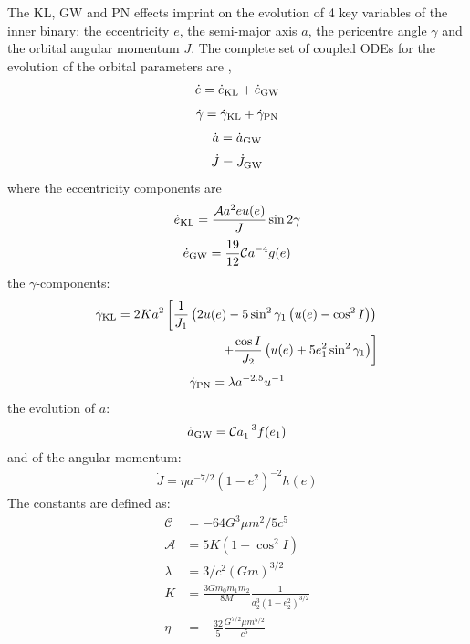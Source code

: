 \documentclass[a4paper,fleqn,usenatbib]{mnras}
\begin{document}
\noindent The KL, GW and PN effects imprint on the evolution of 4 key variables of the inner binary: the eccentricity $e$, the semi-major axis $a$, the pericentre angle $\gamma$ and the orbital angular momentum $J$. The complete set of coupled ODEs for the evolution of the orbital parameters are \citep{Randall2018},
\begin{eqnarray}
\dot{e} = \dot{e}_{\rm KL} + \dot{e}_{\rm GW}
\label{eq:edot}
\end{eqnarray}
\begin{eqnarray}
\dot{\gamma} = \dot{\gamma}_{\rm KL} + \dot{\gamma}_{\rm PN}
\end{eqnarray}
\begin{eqnarray}
\dot{a} = \dot{a}_{\rm GW} 
\label{eq:gwdot}
\end{eqnarray}
\begin{eqnarray}
\dot{J} = \dot{J}_{\rm GW} 
\label{eq:gwdot}
\end{eqnarray}
where the eccentricity components are
\begin{eqnarray}
\dot{e}_{\rm KL} =   \frac{\mathcal{A} a^2 e u(e)}{J}  \sin 2 \gamma
\end{eqnarray}
\begin{eqnarray}
\dot{e}_{\rm GW} = \frac{19}{12} \mathcal{C} a^{-4} g(e)
\end{eqnarray}
the $\gamma$-components:
\begin{align}
\dot{\gamma}_{\rm KL} = 2 Ka^2\left[\frac{1}{J_{1}}\left(2u(e)-5 \sin ^{2} \gamma_{1}\left(u(e)-\cos ^{2} I\right) \right)\right. \\
\left.+\frac{\cos I}{J_{2}}\left(u(e)+5 e_{1}^{2} \sin ^{2} \gamma_{1}\right) \right]
\end{align}
\begin{eqnarray}
\dot{\gamma}_{\rm PN} = \lambda a^{-2.5} u^{-1 }
\end{eqnarray}
the evolution of $a$:
\begin{eqnarray}
\dot{a}_{\rm GW} = \mathcal{C} a_{1}^{-3} f(e_1)
\end{eqnarray}
and of the angular momentum:
\begin{eqnarray}
\dot{J} = \eta a^{-7/2} (1-e^2)^{-2} h(e)
\end{eqnarray}
The constants are defined as:
\begin{align}
\mathcal{C} &= -64 G^{3} \mu m^{2} / 5c^5 \\
\mathcal{A} &= 5 K \left(1-\cos ^{2} I\right) \\
\lambda &= 3/c^2 (Gm)^{3/2} \\
K &= \frac{3 G m_{0} m_{1} m_{2}}{8 M} \frac{1}{a_{2}^{3}\left(1-e_{2}^{2}\right)^{3 / 2}} \\
\eta &= -\frac{32}{5} \frac{G^{7/2} \mu m^{5/2}}{c^5}
\end{align}
\end{document}
